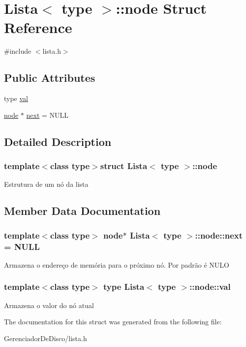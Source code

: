 \hypertarget{structLista_1_1node}{}\section{Lista$<$ type $>$\+:\+:node Struct Reference}
\label{structLista_1_1node}


{\ttfamily \#include $<$lista.\+h$>$}

\subsection*{Public Attributes}
\begin{DoxyCompactItemize}
\item 
type \hyperlink{structLista_1_1node_a296293814eb82b9a0ff188a8a4c7aedc}{val}
\item 
\hyperlink{structLista_1_1node}{node} $\ast$ \hyperlink{structLista_1_1node_a352a7913205b61620f95559234ebbf40}{next} = N\+U\+L\+L
\end{DoxyCompactItemize}


\subsection{Detailed Description}
\subsubsection*{template$<$class type$>$struct Lista$<$ type $>$\+::node}

Estrutura de um nó da lista 

\subsection{Member Data Documentation}
\hypertarget{structLista_1_1node_a352a7913205b61620f95559234ebbf40}{}
\subsubsection[{next}]{\setlength{\rightskip}{0pt plus 5cm}template$<$class type$>$ {\bf node}$\ast$ {\bf Lista}$<$ type $>$\+::node\+::next = N\+U\+L\+L}\label{structLista_1_1node_a352a7913205b61620f95559234ebbf40}
Armazena o endereço de memória para o próximo nó. Por padrão é N\+U\+L\+O \hypertarget{structLista_1_1node_a296293814eb82b9a0ff188a8a4c7aedc}{}
\subsubsection[{val}]{\setlength{\rightskip}{0pt plus 5cm}template$<$class type$>$ type {\bf Lista}$<$ type $>$\+::node\+::val}\label{structLista_1_1node_a296293814eb82b9a0ff188a8a4c7aedc}
Armazena o valor do nó atual 

The documentation for this struct was generated from the following file\+:\begin{DoxyCompactItemize}
\item 
Gerenciador\+De\+Disco/lista.\+h\end{DoxyCompactItemize}
